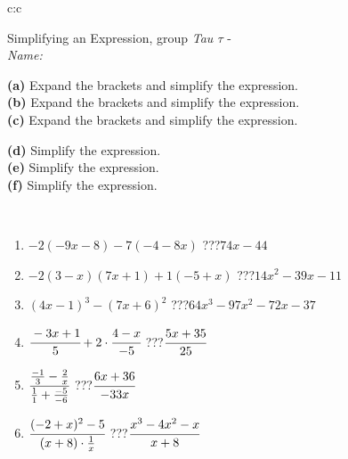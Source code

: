 \documentclass[10pt]{report}
\begin{document}
\newpage
\thispagestyle{empty}
\begin{tabular}{c:c}
\begin{minipage}[c][104.5mm][t]{0.5\linewidth}
\begin{center}
\vspace{7mm}
{\huge Simplifying an Expression, group \textit{Tau $\tau$} -}\\[5mm]
\textit{Name:}\phantom{xxxxxxxxxxxxxxxxxxxxxxxxxxxxxxxxxxxxxxxxxxxxxxxxxxxxxxxxxxxxxxxxx}\\[5mm]
\begin{minipage}{0.95\linewidth}
\begin{center}
{\small \begin{minipage}{0.6\textwidth}
\textbf{(a)} Expand the brackets and simplify the expression. \\[1mm]
\textbf{(b)} Expand the brackets and simplify the expression. \\[1mm]
\textbf{(c)} Expand the brackets and simplify the expression.
\end{minipage} \begin{minipage}{0.39\textwidth}
\textbf{(d)} Simplify the expression. \\[1mm]
\textbf{(e)} Simplify the expression. \\[1mm]
\textbf{(f)} Simplify the expression.
\end{minipage}
}
\end{center}
\end{minipage}
\\[4mm]
\begin{minipage}{0.79\linewidth}
\begin{center}
\begin{varwidth}{\linewidth}
\begin{enumerate}
\normalsize
\item $-2(-9x-8)-7(-4-8x)$\quad \dotfill\; ???\;\dotfill \quad $74x-44$
\item $-2(3-x)(7x+1)+1(-5+x)$\quad \dotfill\; ???\;\dotfill \quad $14x^2-39x-11$
\item $(4x-1)^3-(7x+6)^2$\quad \dotfill\; ???\;\dotfill \quad $64x^3-97x^2-72x-37$
\item $\cfrac{-3x+1}{5}+2\cdot\cfrac{4-x}{-5}$\quad \dotfill\; ???\;\dotfill \quad $\cfrac{5x+35}{25}$
\item $\cfrac{\frac{-1}{3}-\frac{2}{x}}{\frac{1}{1}+\frac{-5}{-6}}$\quad \dotfill\; ???\;\dotfill \quad $\cfrac{6x+36}{-33x}$
\item $\cfrac{(-2+x)^2-5}{(x+8)\cdot\frac{1}{x}}$\quad \dotfill\; ???\;\dotfill \quad $\cfrac{x^3-4x^2-x}{x+8}$

\end{enumerate}
\end{varwidth}
\end{center}
\end{minipage}
\end{center}
\end{minipage}
\end{tabular}
\end{document}
